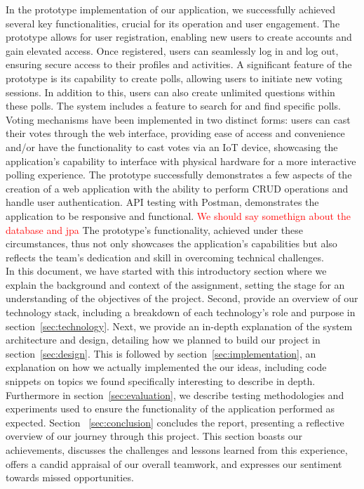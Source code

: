 \noindent In the prototype implementation of our application, we successfully achieved several key functionalities, crucial for its operation and user engagement. The prototype allows for user registration, enabling new users to create accounts and gain elevated access. Once registered, users can seamlessly log in and log out, ensuring secure access to their profiles and activities. A significant feature of the prototype is its capability to create polls, allowing users to initiate new voting sessions. In addition to this, users can also create unlimited questions within these polls. The system includes a feature to search for and find specific polls. Voting mechanisms have been implemented in two distinct forms: users can cast their votes through the web interface, providing ease of access and convenience and/or  have the functionality to cast votes via an IoT device, showcasing the application's capability to interface with physical hardware for a more interactive polling experience.  The prototype successfully demonstrates a few aspects of the creation of a web application with the ability to perform CRUD operations and handle user authentication.  API testing with Postman, demonstrates the application to be responsive and functional. \textcolor{red}{We should say somethign about the database and jpa} The prototype's functionality, achieved under these circumstances, thus not only showcases the application's capabilities but also reflects the team's dedication and skill in overcoming technical challenges.\\



\noindent In this document, we have started with this introductory section where we explain the background and context of the assignment, setting the stage for an understanding of the objectives of the project.  Second, provide an overview of our technology stack, including a breakdown of each technology's role and purpose in section~\ref{sec:technology}.  Next, we provide an in-depth explanation of the system architecture and design, detailing how we planned to build our project in section~\ref{sec:design}.  This is followed by section~\ref{sec:implementation}, an explanation on how we actually implemented the our ideas, including code snippets on topics we found specifically interesting to describe in depth.  Furthermore in section~\ref{sec:evaluation}, we describe testing methodologies and experiments used to ensure the functionality of the application performed as expected.  Section ~\ref{sec:conclusion} concludes the report, presenting a reflective overview of our journey through this project. This section boasts our achievements, discusses the challenges and lessons learned from this experience, offers a candid appraisal of our overall teamwork, and expresses our sentiment towards missed opportunities.

